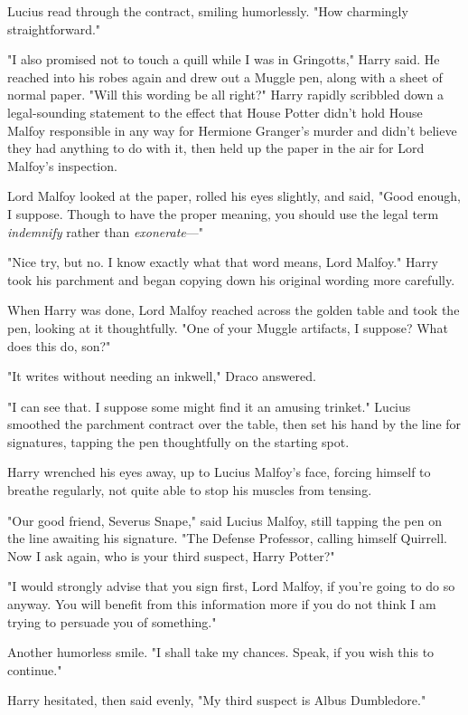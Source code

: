 Lucius read through the contract, smiling humorlessly. "How charmingly
straightforward."

"I also promised not to touch a quill while I was in Gringotts," Harry said. He
reached into his robes again and drew out a Muggle pen, along with a sheet of
normal paper. "Will this wording be all right?" Harry rapidly scribbled down a
legal-sounding statement to the effect that House Potter didn't hold House
Malfoy responsible in any way for Hermione Granger's murder and didn't believe
they had anything to do with it, then held up the paper in the air for Lord
Malfoy's inspection.

Lord Malfoy looked at the paper, rolled his eyes slightly, and said, "Good
enough, I suppose. Though to have the proper meaning, you should use the legal
term \emph{indemnify} rather than \emph{exonerate}\mbox{---}"

"Nice try, but no. I know exactly what that word means, Lord Malfoy." Harry
took his parchment and began copying down his original wording more carefully.

When Harry was done, Lord Malfoy reached across the golden table and took the
pen, looking at it thoughtfully. "One of your Muggle artifacts, I suppose? What
does this do, son?"

"It writes without needing an inkwell," Draco answered.

"I can see that. I suppose some might find it an amusing trinket." Lucius
smoothed the parchment contract over the table, then set his hand by the line
for signatures, tapping the pen thoughtfully on the starting spot.

Harry wrenched his eyes away, up to Lucius Malfoy's face, forcing himself to
breathe regularly, not quite able to stop his muscles from tensing.

"Our good friend, Severus Snape," said Lucius Malfoy, still tapping the pen on
the line awaiting his signature. "The Defense Professor, calling himself
Quirrell. Now I ask again, who is your third suspect, Harry Potter?"

"I would strongly advise that you sign first, Lord Malfoy, if you're going to
do so anyway. You will benefit from this information more if you do not think I
am trying to persuade you of something."

Another humorless smile. "I shall take my chances. Speak, if you wish this to
continue."

Harry hesitated, then said evenly, "My third suspect is Albus Dumbledore."

